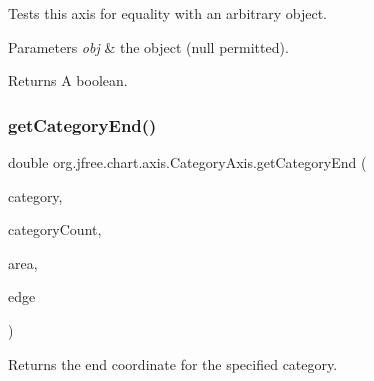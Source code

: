Tests this axis for equality with an arbitrary object.


\begin{DoxyParams}{Parameters}
{\em obj} & the object ({\ttfamily null} permitted).\\
\hline
\end{DoxyParams}
\begin{DoxyReturn}{Returns}
A boolean. 
\end{DoxyReturn}
\mbox{\label{classorg_1_1jfree_1_1chart_1_1axis_1_1_category_axis_a4ec54d3044c08950959afdd622326c36}} 
\subsubsection{\texorpdfstring{get\+Category\+End()}{getCategoryEnd()}}
{\footnotesize\ttfamily double org.\+jfree.\+chart.\+axis.\+Category\+Axis.\+get\+Category\+End (\begin{DoxyParamCaption}\item[{int}]{category,  }\item[{int}]{category\+Count,  }\item[{Rectangle2D}]{area,  }\item[{Rectangle\+Edge}]{edge }\end{DoxyParamCaption})}

Returns the end coordinate for the specified category.


